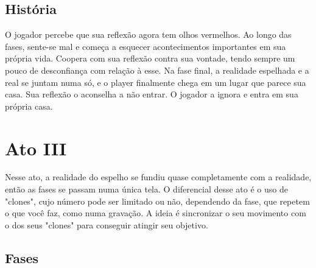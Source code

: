 \documentclass[a4paper, 11pt]{article}
\begin{document}
 
\subsection{História} 
 
	O jogador percebe que sua reflexão agora tem olhos vermelhos. Ao longo das fases, sente-se mal e começa a esquecer acontecimentos importantes em sua própria vida. Coopera com sua reflexão contra sua vontade, tendo sempre um pouco de desconfiança com relação à esse. Na fase final, a realidade espelhada e a real se juntam numa só, e o player finalmente chega em um lugar que parece sua casa. Sua reflexão o aconselha a não entrar. O jogador a ignora e entra em sua própria casa.
 
\section{Ato III} 
 
	Nesse ato, a realidade do espelho se fundiu quase completamente com a realidade, então as fases se passam numa única 
	tela. O diferencial desse ato é o uso de "clones", cujo número pode ser limitado ou não, dependendo da fase, que repetem o que você faz, como numa gravação. A ideia é sincronizar o seu movimento com o dos seus "clones" para conseguir atingir seu objetivo. 
 
\subsection{Fases} 
 
\end{document}
